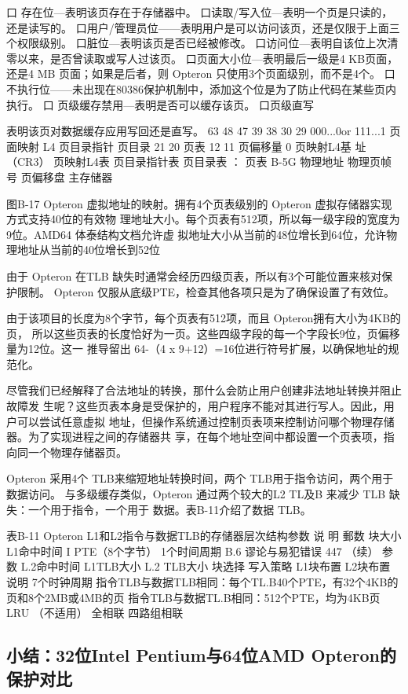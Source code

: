口 存在位—表明该页存在于存储器中。
口读取/写入位—表明一个页是只读的，还是读写的。
口用户/管理员位——表明用户是可以访问该页，还是仅限于上面三个权限级别。
口脏位—表明该页是否已经被修改。
口访问位—表明自该位上次清零以来，是否曾读取或写人过该页。
口页面大小位—表明最后一级是4 KB页面，还是4 MB 页面；如果是后者，则 Opteron
只使用3个页面级别，而不是4个。
口 不执行位——未出现在80386保护机制中，添加这个位是为了防止代码在某些页内执行。
口 页级缓存禁用—表明是否可以缓存该页。
口页级直写

表明该页对数据缓存应用写回还是直写。
63
48 47
39 38
30 29
000...0or
111...1
页面映射 L4
页目录指针
页目录
21 20
页表
12 11
页偏移量
0
页映射L4基
址（CR3）
页映射L4表
页目录指针表
页目录表
：
页表
B-5G
物理地址
物理页帧号
页偏移盘
主存储器

图B-17 Opteron 虚拟地址的映射。拥有4个页表级别的 Opteron 虚拟存储器实现方式支持40位的有效物
理地址大小。每个页表有512项，所以每一级字段的宽度为9位。AMD64 体泰结构文档允许虚
拟地址大小从当前的48位增长到64位，允许物理地址从当前的40位增长到52位

由于 Opteron 在TLB 缺失时通常会经历四级页表，所以有3个可能位置来核对保护限制。
Opteron 仅服从底级PTE，检查其他各项只是为了确保设置了有效位。

由于该项目的长度为8个字节，每个页表有512项，而且 Opteron拥有大小为4KB的页，
所以这些页表的长度恰好为一页。这些四级字段的每一个字段长9位，页偏移量为12位。这一
推导留出 64-（4 x 9+12）=16位进行符号扩展，以确保地址的规范化。

尽管我们已经解释了合法地址的转换，那什么会防止用户创建非法地址转换并阻止故障发
生呢？这些页表本身是受保护的，用户程序不能对其进行写人。因此，用户可以尝试任意虚拟
地址，但操作系统通过控制页表项来控制访问哪个物理存储器。为了实现进程之间的存储器共
享，在每个地址空间中都设置一个页表项，指向同一个物理存储器页。

Opteron 采用4个 TLB来缩短地址转换时间，两个 TLB用于指令访问，两个用于数据访问。
与多级缓存类似，Opteron 通过两个较大的L2 TL及B 来减少 TLB 缺失：一个用于指令，一个用于
数据。表B-11介绍了数据 TLB。

表B-11
Opteron L1和L2指令与数据TLB的存储器层次结构参数
说 明
郵数
块大小
L1命中时间
I PTE（8个字节）
1个时间周期
B.6 谬论与易犯错误
447
（续）
参
数
L.2命中时间
L1TLB大小
L.2 TLB大小
块选择
写入策略
L1块布置
L2块布置
说明
7个时钟周期
指令TLB与数据TLB相同：每个TL.B40个PTE，有32个4KB的页和8个2MB或4MB的页
指令TLB与数据TL.B相同：512个PTE，均为4KB页
LRU
（不适用）
全相联
四路组相联

\subsection{小结：32位Intel Pentium与64位AMD Opteron的保护对比}

